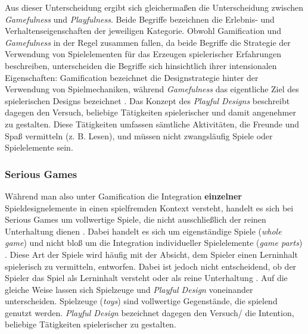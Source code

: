 Aus dieser Unterscheidung ergibt sich gleichermaßen die Unterscheidung zwischen \textit{Gamefulness} und \textit{Playfulness}. Beide Begriffe bezeichnen die Erlebnis- und Verhaltenseigenschaften der jeweiligen Kategorie. Obwohl Gamification und \textit{Gamefulness} in der Regel zusammen fallen, da beide Begriffe die Strategie der Verwendung von Spielelementen für das Erzeugen spielerischer Erfahrungen beschreiben, unterscheiden die Begriffe sich hinsichtlich ihrer intensionalen Eigenschaften: Gamification bezeichnet die Designstrategie hinter der Verwendung von Spielmechaniken, während \textit{Gamefulness} das eigentliche Ziel des spielerischen Designs bezeichnet \cite{deterding_game_2011}. Das Konzept des \textit{Playful Designs} beschreibt dagegen den Versuch, beliebige Tätigkeiten spielerischer und damit angenehmer zu gestalten. Diese Tätigkeiten umfassen sämtliche Aktivitäten, die Freunde und Spaß vermitteln (z. B. Lesen), und müssen nicht zwangsläufig Spiele oder Spielelemente sein.


\subsubsection{Serious Games}
Während man also unter Gamification die Integration \textbf{einzelner} Spieldesignelemente in einen spielfremden Kontext versteht, handelt es sich bei Serious Games um vollwertige Spiele, die nicht ausschließlich der reinen Unterhaltung dienen \cite[S. 17]{michael_serious_2005}. Dabei handelt es sich um eigenständige Spiele (\textit{whole game}) und nicht bloß um die Integration individueller Spielelemente (\textit{game parts}) \cite{deterding_game_2011}. Diese Art der Spiele wird häufig mit der Absicht, dem Spieler einen Lerninhalt spielerisch zu vermitteln, entworfen. Dabei ist jedoch nicht entscheidend, ob der Spieler das Spiel als Lerninhalt versteht oder als reine Unterhaltung \cite[S.3]{bopp_serious_2009}. Auf die gleiche Weise lassen sich Spielzeuge und \textit{Playful Design} voneinander unterscheiden. Spielzeuge (\textit{toys}) sind vollwertige Gegenstände, die spielend genutzt werden. \textit{Playful Design} bezeichnet dagegen den Versuch/ die Intention, beliebige Tätigkeiten spielerischer zu gestalten.

